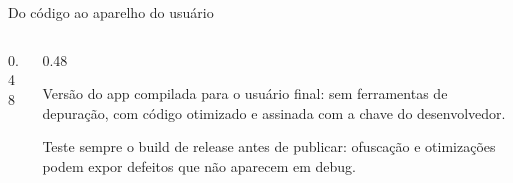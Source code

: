 \begin{frame}{Do código ao aparelho do usuário}
\begin{columns}[T]
\begin{column}{0.48\textwidth}
    \end{column}
    \begin{column}{0.48\textwidth}
      \begin{definicao}
        Versão do app compilada para o usuário final: sem ferramentas de depuração, com código otimizado e assinada com a chave do desenvolvedor.
      \end{definicao}
      \begin{atencao}
        Teste sempre o build de release antes de publicar: ofuscação e otimizações podem expor defeitos que não aparecem em debug.
      \end{atencao}
    \end{column}
  \end{columns}
\end{frame}


